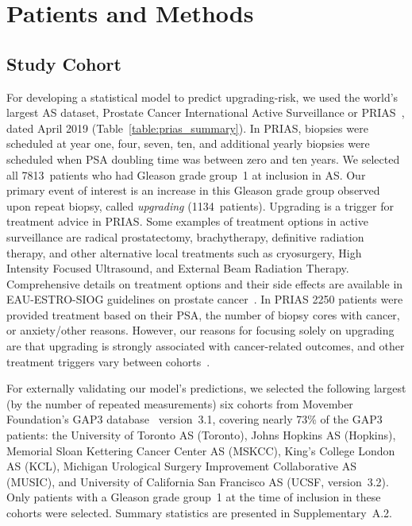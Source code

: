 \section{Patients and Methods}
\subsection{Study Cohort}
\label{subsec:cohort}
For developing a statistical model to predict upgrading-risk, we used the world's largest AS dataset, Prostate Cancer International Active Surveillance or PRIAS~\citep{bul2013active}, dated April 2019 (Table~\ref{table:prias_summary}). In PRIAS, biopsies were scheduled at year one, four, seven, ten, and additional yearly biopsies were scheduled when PSA doubling time was between zero and ten years. We selected all 7813~patients who had Gleason grade group~1 at inclusion in AS. Our primary event of interest is an increase in this Gleason grade group observed upon repeat biopsy, called \textit{upgrading} (1134~patients). Upgrading is a trigger for treatment advice in PRIAS. Some examples of treatment options in active surveillance are radical prostatectomy, brachytherapy, definitive radiation therapy, and other alternative local treatments such as cryosurgery, High Intensity Focused Ultrasound, and External Beam Radiation Therapy. Comprehensive details on treatment options and their side effects are available in EAU-ESTRO-SIOG guidelines on prostate cancer~\citep{mottet2017eau}. In PRIAS 2250 patients were provided treatment based on their PSA, the number of biopsy cores with cancer, or anxiety/other reasons. However, our reasons for focusing solely on upgrading are that upgrading is strongly associated with cancer-related outcomes, and other treatment triggers vary between cohorts~\citep{nieboer2018active}.

For externally validating our model's predictions, we selected the following largest (by the number of repeated measurements) six cohorts from Movember Foundation's GAP3 database~\citep{gap3_2018} version~3.1, covering nearly 73\% of the GAP3 patients: the University of Toronto AS (Toronto), Johns Hopkins AS (Hopkins), Memorial Sloan Kettering Cancer Center AS (MSKCC), King's College London AS (KCL), Michigan Urological Surgery Improvement Collaborative AS (MUSIC), and University of California San Francisco AS (UCSF, version~3.2). Only patients with a Gleason grade group~1 at the time of inclusion in these cohorts were selected. Summary statistics are presented in Supplementary~A.2.

